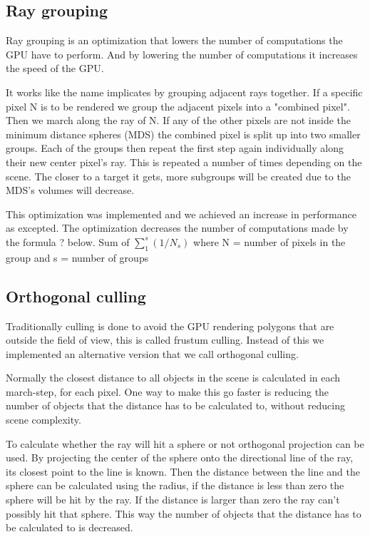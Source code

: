 		

		\subsection{Ray grouping}
		
			Ray grouping is an optimization that lowers the number of
			computations the GPU have to perform. And by lowering the number of
			computations it increases the speed of the GPU.
			
			It works like the name implicates by grouping adjacent rays
			together. If a specific pixel N is to be rendered we group the
			adjacent pixels into a "combined pixel". Then we march along the
			ray of N. If any of the other pixels are not inside the minimum
			distance spheres (MDS) the combined pixel is split up into two
			smaller groups. Each of the groups then repeat the first step again
			individually along their new center pixel's ray. This is repeated a
			number of times depending on the scene.  The closer to a target it
			gets, more subgroups will be created due to the MDS's volumes will
			decrease.
			
			This optimization was implemented and we achieved an increase in
			performance as excepted. The optimization decreases the number of
			computations made by the formula ? below.  Sum of $\sum_1^s(1/N_s)$
			where N = number of pixels in the group and s = number of groups


		\subsection{Orthogonal culling}

			Traditionally culling is done to avoid the GPU rendering polygons 
			that are outside the field of view, this is called frustum culling. Instead 
			of this we implemented an alternative version that we call orthogonal
			culling.

			Normally the closest distance to all objects in the scene is calculated
			in each march-step, for each pixel. One way to make this go faster is 
			reducing the number of objects that the distance has to be calculated 
			to, without reducing scene complexity. 

			To calculate whether the ray will hit a sphere or not orthogonal 
			projection can be used. By projecting the center of the sphere onto
			the directional line of the ray, its closest point to the line is known.
			Then the distance between the line and the sphere can be calculated using
			the radius, if the distance is less than zero the sphere will be hit
			by the ray. If the distance is larger than zero the ray can't possibly hit 
			that sphere. This way the number of objects that the distance has to be 
			calculated to is decreased. 

